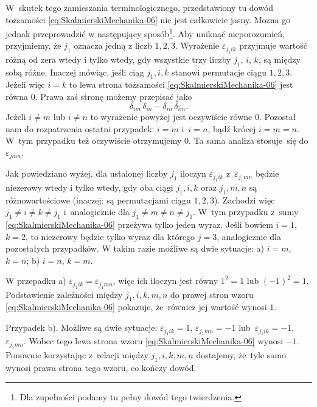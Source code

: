 \documentclass[a4paper,11pt]{article}
\begin{document}
W~skutek tego zamieszania terminologicznego, przedstawiony tu dowód
tożsamości \eqref{eq:SkalmierskiMechanika-06} nie jest całkowicie jasny.
Można go jednak przeprowadzić w następujący sposób\footnote{Dla zupełności
  podamy tu pełny dowód tego twierdzenia.}. Aby uniknąć nieporozumień,
przyjmiemy, że $j_{ 1 }$ oznacza jedną z liczb $1, 2, 3$. Wyrażenie
$\varepsilon_{ j_{ 1 } i k }$ przyjmuje wartość różną od zera wtedy i tylko wtedy, gdy
wszystkie trzy liczby $j_{ 1 }$, $i$, $k$, są między sobą różne. Inaczej
mówiąc, jeśli ciąg $j_{ 1 }, i, k$ stanowi permutacje ciągu $1, 2, 3$.
Jeżeli więc $i = k$ to lewa strona tożsamości
\eqref{eq:SkalmierskiMechanika-06} jest równa 0.
Prawa zaś stronę możemy przepisać jako
\begin{equation}
  \label{eq:SkalmierskiMechanika-07}
  \delta_{ i m } \, \delta_{ i n } - \delta_{ i n } \, \delta_{ i m }.
\end{equation}
Jeżeli $i \neq m$ lub $i \neq n$ to wyrażenie powyżej jest oczywiście równe 0.
Pozostał nam do rozpatrzenia ostatni przypadek: $i = m$ i~$i = n$, bądź
krócej $i = m = n$. W~tym przypadku też oczywiście otrzymujemy 0. Ta sama
analiza stosuje~się do $\varepsilon_{ j m n }$.

Jak powiedziano wyżej, dla ustalonej liczby $j_{ 1 }$ iloczyn
$\varepsilon_{ j_{ 1 } i k }$ z~$\varepsilon_{ j_{ 1 } m n }$ będzie niezerowy wtedy i tylko wtedy,
gdy oba ciągi $j_{ 1 }, i, k$ oraz $j_{ 1 }, m, n$ są różnowartościowe
(inaczej: są permutacjami ciągu $1, 2, 3$). Zachodzi więc
$j_{ 1 } \neq i \neq k \neq j_{ 1 }$ i~analogicznie dla $j_{ 1 } \neq m \neq n \neq j_{ 1 }$.
W~tym przypadku z~sumy \eqref{eq:SkalmierskiMechanika-06} przeżywa tylko
jeden wyraz. Jeśli bowiem $i = 1$, $k = 2$, to niezerowy będzie tylko wyraz
dla którego $j = 3$, analogicznie dla pozostałych przypadków. W takim razie
możliwe są dwie sytuacje: a) $i = m$, $k = n$; b) $i = n$, $k = m$.

W przepadku a) $\varepsilon_{ j_{ 1 } i k } = \varepsilon_{ j_{ 1 } m n }$, więc ich iloczyn jest
równy $1^{ 2 } = 1$ lub $( -1 )^{ 2 } = 1$. Podstawienie zależności między
$j_{ 1 }, i, k, m, n$ do prawej stron wzoru
\eqref{eq:SkalmierskiMechanika-06} pokazuje, że~również jej wartość wynosi
$1$.

Przypadek b). Możliwe są dwie sytuacje:
$\varepsilon_{ j_{ 1 } i k } = 1$, $\varepsilon_{ j_{ 1 } m n } = -1$
lub~$\varepsilon_{ j_{ 1 } i k } = -1$, $\varepsilon_{ j_{ 1 } m n }$. Wobec tego lewa strona wzoru
\eqref{eq:SkalmierskiMechanika-06} wynosi $-1$. Ponownie korzystając
z~relacji między $j_{ 1 }, i, k, m, n$ dostajemy, że~tyle samo wynosi prawa
strona tego wzoru, co kończy dowód.
\end{document}
